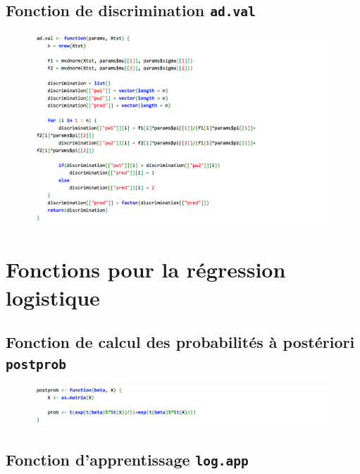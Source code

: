 \documentclass[a4paper,10pt]{report}
\begin{document}
\section{Fonction de discrimination \texttt{ad.val}}
\label{appendix:functions-ana-disc-val}
\begin{figure}[H]
	\centering
	\captionsetup{justification=centering, margin=3cm}
	\includegraphics[width=0.9\linewidth]{img/A-anadisc-val-functions}
	\label{fig:A-1-anadisc-val-functions}
\end{figure}



\chapter{Fonctions pour la régression logistique}
\label{appendix:functions-reg-log}

\section{Fonction de calcul des probabilités à postériori \texttt{postprob}}
\label{appendix:functions-reg-log-postprob}

\begin{figure}[H]
	\centering
	\captionsetup{justification=centering, margin=3cm}
	\includegraphics[width=0.9\linewidth]{img/B-log-post-prob-function}
	\label{fig:B-log-post-prob-function}
\end{figure}

\section{Fonction d'apprentissage \texttt{log.app}}
\label{appendix:functions-reg-log-simple-app}
\end{document}
